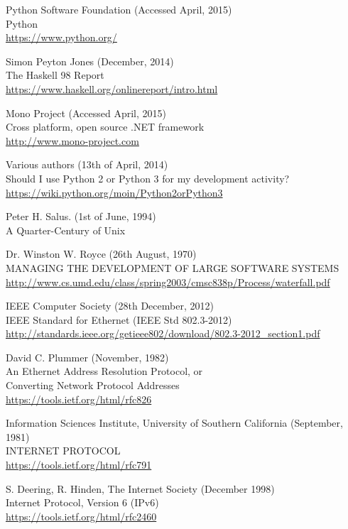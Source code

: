 \documentclass[10pt,a4paper,notitlepage]{report}
\begin{document}
\begin{thebibliography}{99}
	Python Software Foundation (Accessed April, 2015)\\
	Python\\
	\url{https://www.python.org/}

    Simon Peyton Jones (December, 2014)\\
    The Haskell 98 Report\\
    \url{https://www.haskell.org/onlinereport/intro.html}

	Mono Project (Accessed April, 2015)\\
	Cross platform, open source .NET framework\\
	\url{http://www.mono-project.com}

    Various authors (13th of April, 2014)\\
    Should I use Python 2 or Python 3 for my development activity?\\
    \url{https://wiki.python.org/moin/Python2orPython3}

    Peter H. Salus. (1st of June, 1994)\\
    A Quarter-Century of Unix

    Dr. Winston W. Royce (26th August, 1970)\\
    MANAGING THE DEVELOPMENT OF LARGE SOFTWARE SYSTEMS\\
    \url{http://www.cs.umd.edu/class/spring2003/cmsc838p/Process/waterfall.pdf}
    
	IEEE Computer Society (28th December, 2012)\\
	IEEE Standard for Ethernet (IEEE Std 802.3-2012)\\
	\url{http://standards.ieee.org/getieee802/download/802.3-2012_section1.pdf}
	
	David C. Plummer (November, 1982)\\
	An Ethernet Address Resolution Protocol, or\\
	Converting Network Protocol Addresses\\
	\url{https://tools.ietf.org/html/rfc826}
	
	Information Sciences Institute, University of Southern California (September, 1981)\\
	INTERNET PROTOCOL\\
	\url{https://tools.ietf.org/html/rfc791}
	
	S. Deering, R. Hinden, The Internet Society (December 1998)\\
	Internet Protocol, Version 6 (IPv6)\\
	\url{https://tools.ietf.org/html/rfc2460}


\end{thebibliography}
\end{document}
